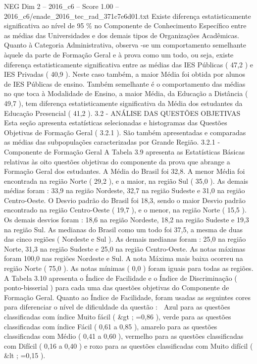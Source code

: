 \begin{textsample}{NEG Dim 2 – 2016\_c6 – Score 1.00 – 2016\_c6/enade\_2016\_tec\_rad\_371c7e6d01.txt}
Existe diferença estatisticamente significativa ao nível de 95 \% no Componente de Conhecimento Específico entre as médias das Universidades e dos demais tipos de Organizações Acadêmicas.
Quanto à Categoria Administrativa, observa -se um comportamento semelhante àquele da parte de Formação Geral e à prova como um todo, ou seja, existe diferença estatisticamente significativa entre as médias das IES Públicas ( 47,2 ) e IES Privadas ( 40,9 ).
Neste caso também, a maior Média foi obtida por alunos de IES Públicas de ensino.
Também semelhante é o comportamento das médias no que toca à Modalidade de Ensino, a maior Média, da Educação a Distância ( 49,7 ), tem diferença estatisticamente significativa da Média dos estudantes da Educação Presencial ( 41,2 ). 3.2 - ANÁLISE DAS QUESTÕES OBJETIVAS Esta seção apresenta estatísticas selecionadas e histogramas das Questões Objetivas de Formação Geral ( 3.2.1 ).
São também apresentadas e comparadas as médias das subpopulações caracterizadas por Grande Região. 3.2.1 - Componente de Formação Geral A Tabela 3.9 apresenta as Estatísticas Básicas relativas às oito questões objetivas do componente da prova que abrange a Formação Geral dos estudantes.
A Média do Brasil foi 32,8.
A menor Média foi encontrada na região Norte ( 29,2 ), e a maior, na região Sul ( 35,0 ).
As demais médias foram : 33,9 na região Nordeste, 32,7 na região Sudeste e 31,0 na região Centro-Oeste.
O Desvio padrão do Brasil foi 18,3, sendo o maior Desvio padrão encontrado na região Centro-Oeste ( 19,7 ), e o menor, na região Norte ( 15,5 ).
Os demais desvios foram : 18,6 na região Nordeste, 18,2 na região Sudeste e 19,3 na região Sul.
As medianas do Brasil como um todo foi 37,5, a mesma de duas das cinco regiões ( Nordeste e Sul ).
As demais medianas foram : 25,0 na região Norte, 31,3 na região Sudeste e 25,0 na região Centro-Oeste.
As notas máximas foram 100,0 nas regiões Nordeste e Sul.
A nota Máxima mais baixa ocorreu na região Norte ( 75,0 ).
As notas mínimas ( 0,0 ) foram iguais para todas as regiões.
A Tabela 3.10 apresenta o Índice de Facilidade e o Índice de Discriminação ( ponto-bisserial ) para cada uma das questões objetivas do Componente de Formação Geral.
Quanto ao Índice de Facilidade, foram usadas as seguintes cores para diferenciar o nível de dificuldade da questão :  Azul para as questões classificadas com índice Muito fácil ( \&gt ; =0,86 ), verde para as questões classificadas com índice Fácil ( 0,61 a 0,85 ), amarelo para as questões classificadas com Médio ( 0,41 a 0,60 ), vermelho para as questões classificadas com Difícil ( 0,16 a 0,40 ) e roxo para as questões classificadas com Muito difícil ( \&lt ; =0,15 ).

\end{textsample}
